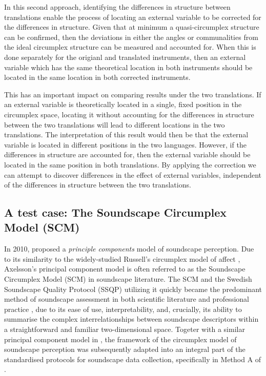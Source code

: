 \documentclass[
  authoryear,
  preprint,
  3p]{elsarticle}
\begin{document}
In this second approach, identifying the differences in structure
between translations enable the process of locating an external variable
to be corrected for the differences in structure. Given that at minimum
a quasi-circumplex structure can be confirmed, then the deviations in
either the angles or communalities from the ideal circumplex structure
can be measured and accounted for. When this is done separately for the
origianl and translated instruments, then an external variable which has
the same theoretical location in both instruments should be located in
the same location in both corrected instruments.

This has an important impact on comparing results under the two
translations. If an external variable is theoretically located in a
single, fixed position in the circumplex space, locating it without
accounting for the differences in structure between the two translations
will lead to different locations in the two translations. The
interpretation of this result would then be that the external variable
is located in different positions in the two languages. However, if the
differences in structure are accounted for, then the external variable
should be located in the same position in both translations. By applying
the correction we can attempt to discover differences in the effect of
external variables, independent of the differences in structure between
the two translations.

\subsection{A test case: The Soundscape Circumplex Model
(SCM)}\label{a-test-case-the-soundscape-circumplex-model-scm}

In 2010, \citet{Axelsson2010principal} proposed a \emph{principle
components} model of soundscape perception. Due to its similarity to the
widely-studied Russell's circumplex model of affect
\citep{Russell1980circumplex}, Axelsson's principal component model is
often referred to as the Soundscape Circumplex Model (SCM) in soundscape
literature. The SCM and the Swedish Soundscape Quality Protocol (SSQP)
\citep{Axelsson2012Swedish} utilizing it quickly became the predominant
method of soundscape assessment in both scientific literature and
professional practice \citep{Aletta2023Adoption}, due to its ease of
use, interpretability, and, crucially, its ability to summarise the
complex interrelationships between soundscape descriptors within a
straightforward and familiar two-dimensional space. Togeter with a
similar principal component model in \citet{Cain2013development}, the
framework of the circumplex model of soundscape perception was
subsequently adapted into an integral part of the standardised protocols
for soundscape data collection, specifically in Method A of
\citet{ISO12913Part2}.
\end{document}

